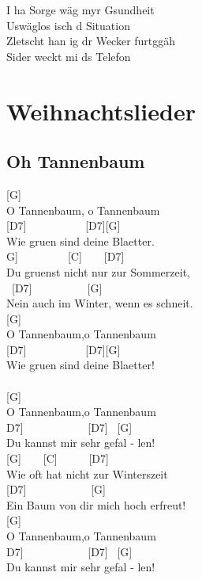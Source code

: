 \documentclass[
  letterpaper,
  twoside=false]{scrbook}
\begin{document}
I ha Sorge wäg myr Gsundheit\\
Uswäglos isch d Situation\\
Zletscht han ig dr Wecker furtggäh\\
Sider weckt mi ds Telefon

\part{Weihnachtslieder}

\hypertarget{oh-tannenbaum}{%
\chapter{Oh Tannenbaum}\label{oh-tannenbaum}}

{[}G{]} ~ ~ ~ ~ ~\\
O Tannenbaum, o Tannenbaum\\
\hspace*{0.333em} {[}D7{]} ~ ~ ~ ~ ~ ~ {[}D7{]}{[}G{]} ~ ~ ~\\
Wie gruen sind deine Blaetter.\\
\hspace*{0.333em}{[}G{]} ~ ~ ~ ~ ~ {[}C{]} ~ ~ {[}D7{]} ~ ~\\
Du gruenst nicht nur zur Sommerzeit,\\
\hspace*{0.333em} ~{[}D7{]} ~ ~ ~ ~ ~ ~{[}G{]} ~ ~\\
Nein auch im Winter, wenn es schneit.\\
{[}G{]} ~ ~ ~\\
O Tannenbaum,o Tannenbaum\\
\hspace*{0.333em} {[}D7{]} ~ ~ ~ ~ ~ ~ {[}D7{]}{[}G{]} ~ ~\\
Wie gruen sind deine Blaetter!\\
\hspace*{0.333em}\\
{[}G{]} ~\\
O Tannenbaum,o Tannenbaum\\
\hspace*{0.333em}{[}D7{]} ~ ~ ~ ~ ~ ~ ~{[}D7{]} ~{[}G{]} ~ ~ ~\\
Du kannst mir sehr gefal - len!\\
\hspace*{0.333em} {[}G{]} ~ ~ {[}C{]} ~ ~ ~ {[}D7{]} ~ ~ ~\\
Wie oft hat nicht zur Winterszeit\\
\hspace*{0.333em} {[}D7{]} ~ ~ ~ ~ ~ ~ ~{[}G{]} ~ ~\\
Ein Baum von dir mich hoch erfreut!\\
{[}G{]} ~\\
O Tannenbaum,o Tannenbaum\\
\hspace*{0.333em}{[}D7{]} ~ ~ ~ ~ ~ ~ ~{[}D7{]} ~{[}G{]} ~ ~\\
Du kannst mir sehr gefal - len!
\end{document}
